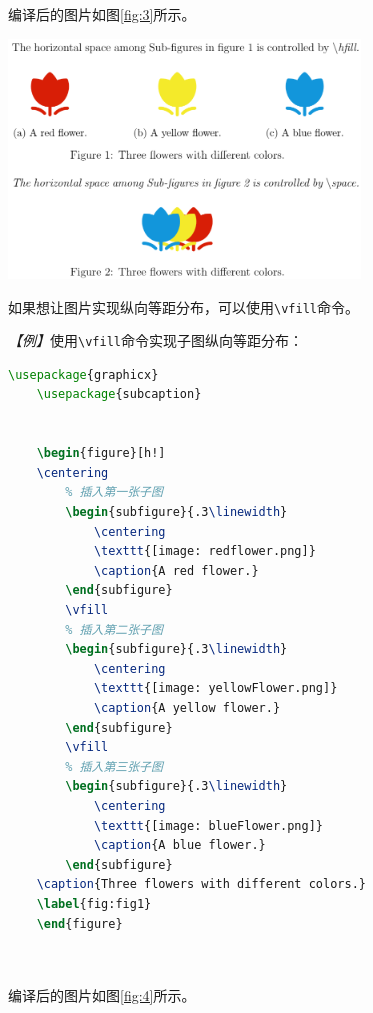编译后的图片如图\ref{fig:3}所示。

\begin{center}
    \includegraphics[width = 0.7\textwidth]{images/eg_10.png}
    \label{fig:3}
\end{center}

如果想让图片实现纵向等距分布，可以使用\texttt{\textbackslash{}vfill}命令。

\emph{【例】}使用\texttt{\textbackslash{}vfill}命令实现子图纵向等距分布：
\begin{lstlisting}[language=TeX]
    \usepackage{graphicx}
    \usepackage{subcaption}
    

    \begin{figure}[h!]
    \centering
        % 插入第一张子图
        \begin{subfigure}{.3\linewidth}
            \centering
            \texttt{[image: redflower.png]}
            \caption{A red flower.}
        \end{subfigure}
        \vfill
        % 插入第二张子图
        \begin{subfigure}{.3\linewidth}
            \centering
            \texttt{[image: yellowFlower.png]}
            \caption{A yellow flower.}
        \end{subfigure}
        \vfill
        % 插入第三张子图
        \begin{subfigure}{.3\linewidth}
            \centering
            \texttt{[image: blueFlower.png]}
            \caption{A blue flower.}
        \end{subfigure}
    \caption{Three flowers with different colors.}
    \label{fig:fig1}
    \end{figure}

    
\end{lstlisting}

编译后的图片如图\ref{fig:4}所示。

